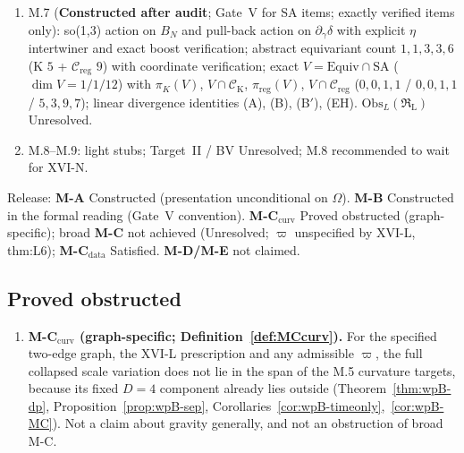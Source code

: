 \documentclass{article}
\theoremstyle{remark}
\newcommand{\RL}{\mathfrak R_{\mathrm L}}
\newcommand{\Creg}{\mathcal C_{\mathrm{reg}}}
\begin{document}
\begin{enumerate}
\item M.7 (\textbf{Constructed after audit}; Gate~V for SA items; exactly verified items only): so(1,3) action on $B_N$ and pull-back action on $\partial_\gamma\delta$ with explicit $\eta$ intertwiner and exact boost verification; abstract equivariant count $1,1,3,3,6$ (K $5$ + $\Creg$ $9$) with coordinate verification; exact $V=\mathrm{Equiv}\cap\mathrm{SA}$ ($\dim V=1/1/12$) with $\pi_K(V)$, $V\cap\mathcal C_{\mathrm K}$, $\pi_{\mathrm{reg}}(V)$, $V\cap\Creg$ ($0,0,1,1$ / $0,0,1,1$ / $5,3,9,7$); linear divergence identities (A), (B), (B$'$), (EH). $\mathrm{Obs}_L(\RL)$ Unresolved.
\item M.8--M.9: light stubs; Target~II / BV Unresolved; M.8 recommended to wait for XVI-N.
\end{enumerate}
Release: \textbf{M-A} Constructed (presentation unconditional on $\Omega$). \textbf{M-B} Constructed in the formal reading (Gate~V convention). \textbf{M-C$_{\mathrm{curv}}$} Proved obstructed (graph-specific); broad \textbf{M-C} not achieved (Unresolved; $\varpi$ unspecified by XVI-L, thm:L6); \textbf{M-C$_{\mathrm{data}}$} Satisfied. \textbf{M-D/M-E} not claimed.

\subsection{Proved obstructed}
\begin{enumerate}
\item \textbf{M-C$_{\mathrm{curv}}$ (graph-specific; Definition~\ref{def:MCcurv}).} For the specified two-edge graph, the XVI-L prescription and any admissible $\varpi$, the full collapsed scale variation does not lie in the span of the M.5 curvature targets, because its fixed $D=4$ component already lies outside (Theorem~\ref{thm:wpB-dp}, Proposition~\ref{prop:wpB-sep}, Corollaries~\ref{cor:wpB-timeonly},~\ref{cor:wpB-MC}). Not a claim about gravity generally, and not an obstruction of broad M-C.
\end{enumerate}
\end{document}

